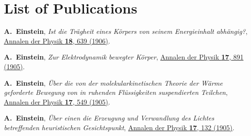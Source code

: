 %
%
%




\chapter*{List of Publications}
\label{publications}

\begin{etaremune}{\small

\item \textbf{A.\ Einstein}, \textit{Ist die Tr\"agheit eines K\"orpers von seinem Energieinhalt abh\"angig?}, \href{http://dx.doi.org/10.1002/andp.19053231314}{Annalen der Physik \textbf{18}, 639 (1906)}.
\item \textbf{A.\ Einstein}, \textit{Zur Elektrodynamik bewegter K\"orper}, \href{http://dx.doi.org/10.1002/andp.19053221004}{Annalen der Physik \textbf{17}, 891 (1905)}.
\item \textbf{A.\ Einstein}, \textit{\"Uber die von der molekularkinetischen Theorie der W\"arme geforderte Bewegung von in ruhenden Fl\"ussigkeiten suspendierten Teilchen}, \href{http://dx.doi.org/10.1002/andp.19053220806}{Annalen der Physik \textbf{17}, 549 (1905)}.
\item \textbf{A.\ Einstein}, \textit{\"Uber einen die Erzeugung und Verwandlung des Lichtes betreffenden heuristischen Gesichtspunkt}, \href{http://dx.doi.org/10.1002/andp.19053220806}{Annalen der Physik \textbf{17}, 132 (1905)}.

}\end{etaremune}

